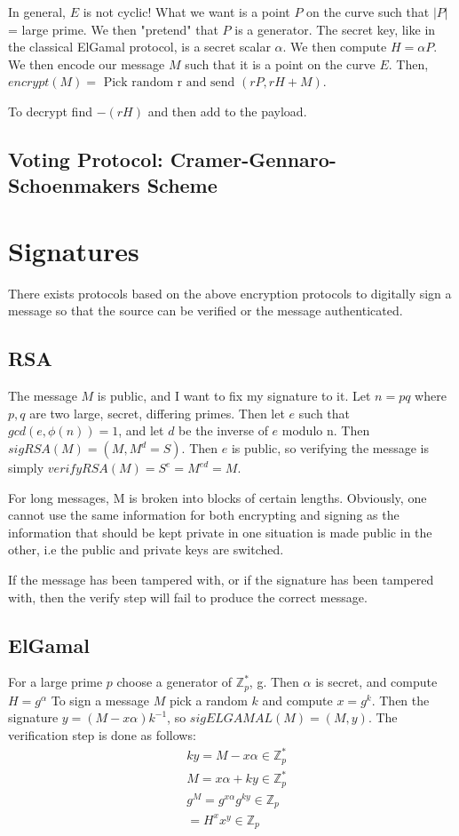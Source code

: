 \documentclass[12pt,a4paper]{article}
\begin{document}
In general, $E$ is not cyclic! What we want is a point $P$ on the curve such that $|P|$ = large prime. We then "pretend" that $P$ is a generator. The secret key, like in the classical ElGamal protocol, is a secret scalar $\alpha$. We then compute $H = \alpha P$. We then encode our message $M$ such that it is a point on the curve $E$. Then, $encrypt(M) = \text{ Pick random r and send } (rP, rH+M)$. 

To decrypt find $-(rH)$ and then add to the payload. 


\subsection{Voting Protocol: Cramer-Gennaro-Schoenmakers Scheme}
\section{Signatures}
There exists protocols based on the above encryption protocols to digitally sign a message so that the source can be verified or the message authenticated. 

\subsection{RSA}
The message $M$ is public, and I want to fix my signature to it. Let $n = pq$ where $p,q$ are two large, secret, differing primes. Then let $e$ such that $gcd(e, \phi(n)) = 1$, and let $d$ be the inverse of $e$ modulo n. Then $sigRSA(M) = (M, M^{d} = S)$. Then $e$ is public, so verifying the message is simply $verifyRSA(M)  = S^{e} = M^{ed} = M$. 

For long messages, M is broken into blocks of certain lengths. Obviously, one cannot use the same information for both encrypting and signing as the information that should be kept private in one situation is made public in the other, i.e the public and private keys are switched. 

If the message has been tampered with, or if the signature has been tampered with, then the verify step will fail to produce the correct message. 


\subsection{ElGamal}
For a large prime $p$ choose a generator of $\mathbb{Z}_{p}^{\ast}$, g. Then $\alpha$ is secret, and compute $H = g^{\alpha}$ To sign a message $M$ pick a random $k$ and compute $x = g^{k}$. Then the signature $y = (M - x\alpha)k^{-1}$, so $sigELGAMAL(M) = (M, y)$. 
The verification step is done as follows:
\begin{align*}
&ky = M-x\alpha \in \mathbb{Z}_{p}^{\ast} \\
&M = x\alpha + ky \in \mathbb{Z}_{p}^{\ast} \\
&g^{M} = g^{x\alpha}g^{ky} \in \mathbb{Z}_{p}  \\
&= H^{x} x^{y} \in \mathbb{Z}_{p}
\end{align*}
\end{document}
